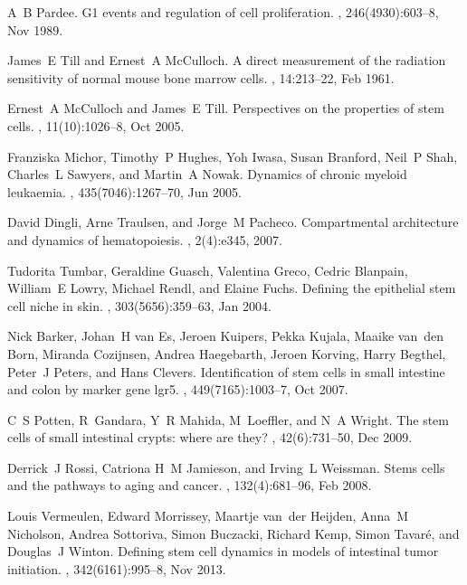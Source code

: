 \documentclass[aps,singlecolumn]{revtex4-1}
\begin{document}
\begin{thebibliography}{10}
A~B Pardee.
\newblock G1 events and regulation of cell proliferation.
, 246(4930):603--8, Nov 1989.

James~E Till and Ernest~A McCulloch.
\newblock A direct measurement of the radiation sensitivity of normal mouse
  bone marrow cells.
, 14:213--22, Feb 1961.

Ernest~A McCulloch and James~E Till.
\newblock Perspectives on the properties of stem cells.
, 11(10):1026--8, Oct 2005.

Franziska Michor, Timothy~P Hughes, Yoh Iwasa, Susan Branford, Neil~P Shah,
  Charles~L Sawyers, and Martin~A Nowak.
\newblock Dynamics of chronic myeloid leukaemia.
, 435(7046):1267--70, Jun 2005.

David Dingli, Arne Traulsen, and Jorge~M Pacheco.
\newblock Compartmental architecture and dynamics of hematopoiesis.
, 2(4):e345, 2007.

Tudorita Tumbar, Geraldine Guasch, Valentina Greco, Cedric Blanpain, William~E
  Lowry, Michael Rendl, and Elaine Fuchs.
\newblock Defining the epithelial stem cell niche in skin.
, 303(5656):359--63, Jan 2004.

Nick Barker, Johan~H van Es, Jeroen Kuipers, Pekka Kujala, Maaike van~den Born,
  Miranda Cozijnsen, Andrea Haegebarth, Jeroen Korving, Harry Begthel, Peter~J
  Peters, and Hans Clevers.
\newblock Identification of stem cells in small intestine and colon by marker
  gene lgr5.
, 449(7165):1003--7, Oct 2007.

C~S Potten, R~Gandara, Y~R Mahida, M~Loeffler, and N~A Wright.
\newblock The stem cells of small intestinal crypts: where are they?
, 42(6):731--50, Dec 2009.

Derrick~J Rossi, Catriona H~M Jamieson, and Irving~L Weissman.
\newblock Stems cells and the pathways to aging and cancer.
, 132(4):681--96, Feb 2008.

Louis Vermeulen, Edward Morrissey, Maartje van~der Heijden, Anna~M Nicholson,
  Andrea Sottoriva, Simon Buczacki, Richard Kemp, Simon Tavar{\'e}, and
  Douglas~J Winton.
\newblock Defining stem cell dynamics in models of intestinal tumor initiation.
, 342(6161):995--8, Nov 2013.


\end{thebibliography}
\end{document}
